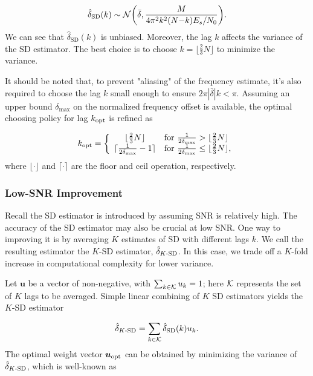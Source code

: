 \begin{equation}
    \label{eq:pdf_delta}
        \hat{\delta}_{\text{SD}}(k) \sim \mathcal{N} \bigg(\bar{\delta},\frac{M}{4\pi^2k^2(N{-}k)E_s/N_0}\bigg).
  \end{equation}  
We can see that $\hat{\delta}_{\text{SD}}(k)$ is unbiased. Moreover, the lag $k$ affects the variance of the SD estimator. 
The best choice is to choose $k=\lfloor\frac{2}{3}N\rfloor$ to minimize the variance.

It should be noted that, to prevent "aliasing" of the frequency estimate, it's also required to choose the lag $k$ small enough to ensure $2\pi |\bar{\delta}| k < \pi$.
Assuming an upper bound $\delta_{\text{max}}$ on the normalized frequency offset is available, 
the optimal choosing policy for lag $k_{\text{opt}}$ is refined as

\begin{equation}
    \label{eq:est_k_opt}
    k_{\text{opt}}=\left\{
      \begin{array}{cl}
        \lfloor\frac{2}{3}N\rfloor
        & \text{for $\frac{1}{2\delta_{\max}}>\lfloor\frac{2}{3}N\rfloor$} \\
        \lceil\frac{1}{2\delta_{\max}}-1\rceil
        & \text{for $\frac{1}{2\delta_{\max}} \leq\lfloor\frac{2}{3}N\rfloor$},
      \end{array}
    \right.
  \end{equation}
where $\lfloor \cdot \rfloor$ and $\lceil \cdot \rceil$ are the floor and ceil operation, respectively.

\subsubsection{Low-SNR Improvement}
Recall the SD estimator is introduced by assuming SNR is relatively high. 
The accuracy of the SD estimator may also be crucial at low SNR.
One way to improving it is by averaging $K$ estimates of SD with different lags $k$.
We call the resulting estimator the $K$-SD estimator, $\hat{\delta}_{K\text{-SD}}$.
In this case, we trade off a $K$-fold increase in computational complexity for lower variance.

Let $\bm{u}$ be a vector of non-negative, with
$\sum_{k \in {\cal K}}u_k=1$; here ${\cal K}$ represents the set of $K$
lags to be averaged.
Simple linear combining of $K$ SD estimators yields the $K$-SD estimator

\begin{equation}
  \label{eq:K_SD_est}
      \hat{\delta}_{K\text{-SD}}=\sum_{k \in \cal K}\hat{\delta}_{\text{SD}}(k)u_k.
\end{equation}
The optimal weight vector $\bm{u}_{\text{opt}}$ can be obtained by minimizing the variance of $\hat{\delta}_{K\text{-SD}}$,
which is well-known as

